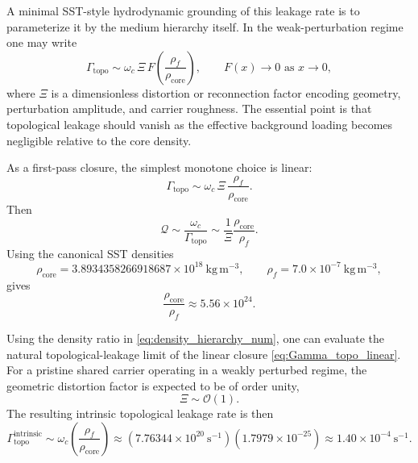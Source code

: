 \documentclass[11pt]{article}
\newcommand{\rhocore}{\rho_{\text{core}}}
\begin{document}
        A minimal SST-style hydrodynamic grounding of this leakage rate is to parameterize it by the medium hierarchy itself. In the weak-perturbation regime one may write
        \begin{equation}
            \Gamma_{\mathrm{topo}}
            \sim
            \omega_c\,\Xi\,
            F\!\left(\frac{\rho_{\!f}}{\rhocore}\right),
            \qquad
            F(x)\to 0 \text{ as } x\to 0,
            \label{eq:Gamma_topo_general}
        \end{equation}
        where \(\Xi\) is a dimensionless distortion or reconnection factor encoding geometry, perturbation amplitude, and carrier roughness. The essential point is that topological leakage should vanish as the effective background loading becomes negligible relative to the core density.

        As a first-pass closure, the simplest monotone choice is linear:
        \begin{equation}
            \boxed{
            \Gamma_{\mathrm{topo}}
            \sim
            \omega_c\,\Xi\,\frac{\rho_{\!f}}{\rhocore}.
            }
            \label{eq:Gamma_topo_linear}
        \end{equation}
        Then
        \begin{equation}
            \mathcal{Q}
            \sim
            \frac{\omega_c}{\Gamma_{\mathrm{topo}}}
            \sim
            \frac{1}{\Xi}\frac{\rhocore}{\rho_{\!f}}.
            \label{eq:Q_density_hierarchy}
        \end{equation}
        Using the canonical SST densities
        \[
            \rhocore=3.8934358266918687\times 10^{18}\ \mathrm{kg\,m^{-3}},
            \qquad
            \rho_{\!f}=7.0\times 10^{-7}\ \mathrm{kg\,m^{-3}},
        \]
        gives
        \begin{equation}
            \frac{\rhocore}{\rho_{\!f}}
            \approx
            5.56\times 10^{24}.
            \label{eq:density_hierarchy_num}
        \end{equation}

        Using the density ratio in \cref{eq:density_hierarchy_num}, one can evaluate the natural topological-leakage limit of the linear closure \cref{eq:Gamma_topo_linear}. For a pristine shared carrier operating in a weakly perturbed regime, the geometric distortion factor is expected to be of order unity,
        \[
            \Xi \sim \mathcal{O}(1).
        \]
        The resulting intrinsic topological leakage rate is then
        \begin{equation}
            \Gamma_{\mathrm{topo}}^{\mathrm{intrinsic}}
            \sim
            \omega_c\left(\frac{\rho_{\!f}}{\rhocore}\right)
            \approx
            (7.76344\times 10^{20}\ \mathrm{s^{-1}})
            (1.7979\times 10^{-25})
            \approx
            1.40\times 10^{-4}\ \mathrm{s^{-1}}.
            \label{eq:Gamma_topo_intrinsic}
        \end{equation}
\end{document}
